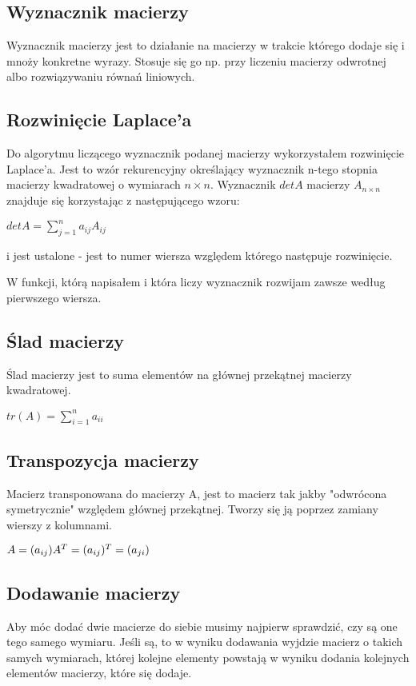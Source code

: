 \documentclass[11pt]{article}
\begin{document}
\subsection{Wyznacznik macierzy}

Wyznacznik macierzy jest to działanie na macierzy w trakcie którego dodaje się i mnoży konkretne wyrazy. Stosuje się go np. przy liczeniu macierzy odwrotnej albo rozwiązywaniu równań liniowych.

\subsection{Rozwinięcie Laplace'a}

Do algorytmu liczącego wyznacznik podanej macierzy wykorzystałem rozwinięcie Laplace'a. Jest to wzór rekurencyjny określający wyznacznik n-tego stopnia macierzy kwadratowej o wymiarach $n \times n$. Wyznacznik $ det A $ macierzy $A_{n \times n} $ znajduje się korzystając z następującego wzoru:

\( det A = \sum_{j = 1}^{n} a_{ij} A_{ij} \)

i jest ustalone - jest to numer wiersza względem którego następuje rozwinięcie.

W funkcji, którą napisałem i która liczy wyznacznik rozwijam zawsze według pierwszego wiersza.

\subsection{Ślad macierzy}
Ślad macierzy jest to suma elementów na głównej przekątnej macierzy kwadratowej.

\( tr(A) = \sum_{i = 1}^{n} a_{ii} \)

\subsection{Transpozycja macierzy}
Macierz transponowana do macierzy A, jest to macierz tak jakby "odwrócona symetrycznie" względem głównej przekątnej. Tworzy się ją poprzez zamiany wierszy z kolumnami.

\( A = (a_{ij}) \\
A^T = (a_{ij})^T = (a_{ji}) \)

\subsection{Dodawanie macierzy}
Aby móc dodać dwie macierze do siebie musimy najpierw sprawdzić, czy są one tego samego wymiaru. Jeśli są, to w wyniku dodawania wyjdzie macierz o takich samych wymiarach, której kolejne elementy powstają w wyniku dodania kolejnych elementów macierzy, które się dodaje.
\end{document}
